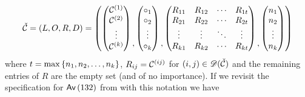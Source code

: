 \[
    \check{\mathcal{C}} = (L,O,R,D) = 
    \left(
    \begin{pmatrix}
        \mathcal{C}^{\left(1\right)}\\ \mathcal{C}^{\left(2\right)}\\ \vdots\\ \mathcal{C}^{\left(k\right)}
    \end{pmatrix}
    \begin{matrix}\\ \\ \\,\end{matrix}
    \begin{pmatrix}
        \circ_1\\\circ_2\\\vdots\\\circ_k
    \end{pmatrix}
    \begin{matrix}\\ \\ \\,\end{matrix}
    \begin{pmatrix}
    R_{11} & R_{12} & \dotsm & R_{1t} \\
    R_{21} & R_{22} & \dotsm & R_{2t} \\
    \vdots & \vdots & \ddots & \vdots \\
    R_{k1} & R_{k2} & \dotsm & R_{kt}
    \end{pmatrix}
    \begin{matrix}\\ \\ \\,\end{matrix}
    \begin{pmatrix}
        n_1\\n_2\\\vdots\\n_k
    \end{pmatrix}
    \right)
\]
where $t = \max\left\{n_1,n_2,\dotsc,n_k\right\}$, $R_{ij} = \mathcal{C}^{\left(ij\right)}$ for $(i,j) \in \mathscr{D}(\check{\mathcal{C}})$ and the remaining entries of $R$ are the empty set (and of no importance). If we revisit the specification for $\textsf{Av}\left(132\right)$ from  with this notation we have 
